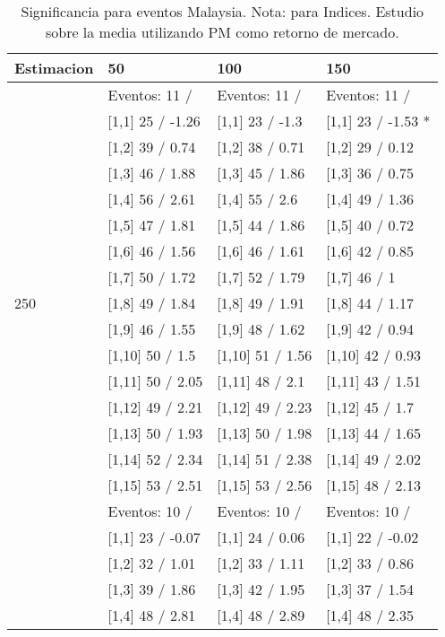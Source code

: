 \begin{table}

\caption{Significancia para eventos Malaysia. Nota: para Indices. Estudio sobre la media utilizando PM como retorno de mercado.}
\centering
\begin{tabular}[t]{llll}
\toprule
Estimacion & 50 & 100 & 150\\
\midrule
 & Eventos:  11 / & Eventos:  11 / & Eventos:  11 /\\
 & {}[1,1] 25  / -1.26 & {}[1,1] 23  / -1.3 & {}[1,1] 23  / -1.53 *\\
 & {}[1,2] 39  / 0.74 & {}[1,2] 38  / 0.71 & {}[1,2] 29  / 0.12\\
 & {}[1,3] 46  / 1.88 & {}[1,3] 45  / 1.86 & {}[1,3] 36  / 0.75\\
 & {}[1,4] 56  / 2.61 & {}[1,4] 55  / 2.6 & {}[1,4] 49  / 1.36\\
\addlinespace
 & {}[1,5] 47  / 1.81 & {}[1,5] 44  / 1.86 & {}[1,5] 40  / 0.72\\
 & {}[1,6] 46  / 1.56 & {}[1,6] 46  / 1.61 & {}[1,6] 42  / 0.85\\
 & {}[1,7] 50  / 1.72 & {}[1,7] 52  / 1.79 & {}[1,7] 46  / 1\\
250 & {}[1,8] 49  / 1.84 & {}[1,8] 49  / 1.91 & {}[1,8] 44  / 1.17\\
 & {}[1,9] 46  / 1.55 & {}[1,9] 48  / 1.62 & {}[1,9] 42  / 0.94\\
\addlinespace
 & {}[1,10] 50  / 1.5 & {}[1,10] 51  / 1.56 & {}[1,10] 42  / 0.93\\
 & {}[1,11] 50  / 2.05 & {}[1,11] 48  / 2.1 & {}[1,11] 43  / 1.51\\
 & {}[1,12] 49  / 2.21 & {}[1,12] 49  / 2.23 & {}[1,12] 45  / 1.7\\
 & {}[1,13] 50  / 1.93 & {}[1,13] 50  / 1.98 & {}[1,13] 44  / 1.65\\
 & {}[1,14] 52  / 2.34 & {}[1,14] 51  / 2.38 & {}[1,14] 49  / 2.02\\
\addlinespace
 & {}[1,15] 53  / 2.51 & {}[1,15] 53  / 2.56 & {}[1,15] 48  / 2.13\\
 & Eventos:  10 / & Eventos:  10 / & Eventos:  10 /\\
 & {}[1,1] 23  / -0.07 & {}[1,1] 24  / 0.06 & {}[1,1] 22  / -0.02\\
 & {}[1,2] 32  / 1.01 & {}[1,2] 33  / 1.11 & {}[1,2] 33  / 0.86\\
 & {}[1,3] 39  / 1.86 & {}[1,3] 42  / 1.95 & {}[1,3] 37  / 1.54\\
\addlinespace
 & {}[1,4] 48  / 2.81 & {}[1,4] 48  / 2.89 & {}[1,4] 48  / 2.35\\

\end{tabular}
\end{table}
